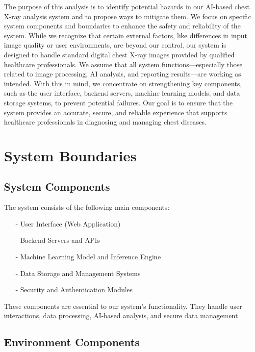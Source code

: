 \documentclass{article}
\begin{document}
The purpose of this analysis is to identify potential hazards in our AI-based chest X-ray analysis system and to propose ways to mitigate them. We focus on specific system components and boundaries to enhance the safety and reliability of the system. While we recognize that certain external factors, like differences in input image quality or user environments, are beyond our control, our system is designed to handle standard digital chest X-ray images provided by qualified healthcare professionals.
\newline
We assume that all system functions—especially those related to image processing, AI analysis, and reporting results—are working as intended. With this in mind, we concentrate on strengthening key components, such as the user interface, backend servers, machine learning models, and data storage systems, to prevent potential failures. Our goal is to ensure that the system provides an accurate, secure, and reliable experience that supports healthcare professionals in diagnosing and managing chest diseases.

\section{System Boundaries}

\subsection{System Components}

The system consists of the following main components:

\begin{itemize}
    \item[-] User Interface (Web Application)
    \item[-] Backend Servers and APIs
    \item[-] Machine Learning Model and Inference Engine
    \item[-] Data Storage and Management Systems
    \item[-] Security and Authentication Modules
\end{itemize}
These components are essential to our system's functionality. They handle user interactions, data processing, AI-based analysis, and secure data management.

\subsection{Environment Components}
\end{document}
